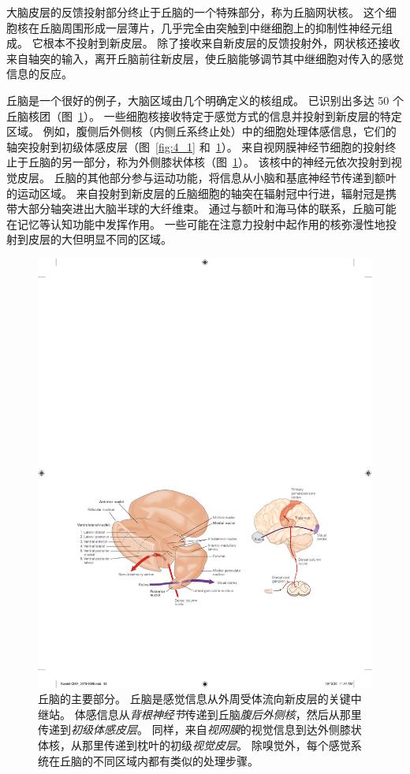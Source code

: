 大脑皮层的反馈投射部分终止于丘脑的一个特殊部分，称为丘脑网状核。 
这个细胞核在丘脑周围形成一层薄片，几乎完全由突触到中继细胞上的抑制性神经元组成。 
它根本不投射到新皮层。 
除了接收来自新皮层的反馈投射外，网状核还接收来自轴突的输入，离开丘脑前往新皮层，使丘脑能够调节其中继细胞对传入的感觉信息的反应。


丘脑是一个很好的例子，大脑区域由几个明确定义的核组成。
已识别出多达 50 个丘脑核团（图~\ref{fig:4_7}）。
一些细胞核接收特定于感觉方式的信息并投射到新皮层的特定区域。
例如，腹侧后外侧核（内侧丘系终止处）中的细胞处理体感信息，它们的轴突投射到初级体感皮层（图~\ref{fig:4_1} 和~\ref{fig:4_7}）。 
来自视网膜神经节细胞的投射终止于丘脑的另一部分，称为外侧膝状体核（图~\ref{fig:4_7}）。 
该核中的神经元依次投射到视觉皮层。 
丘脑的其他部分参与运动功能，将信息从小脑和基底神经节传递到额叶的运动区域。 
来自投射到新皮层的丘脑细胞的轴突在辐射冠中行进，辐射冠是携带大部分轴突进出大脑半球的大纤维束。 
通过与额叶和海马体的联系，丘脑可能在记忆等认知功能中发挥作用。 
一些可能在注意力投射中起作用的核弥漫性地投射到皮层的大但明显不同的区域。


\begin{figure}[htbp]
	\centering
	\includegraphics[width=1.0\linewidth]{chap04/fig_4_7}
	\caption{丘脑的主要部分。
		丘脑是感觉信息从外周受体流向新皮层的关键中继站。
		体感信息从\textit{背根神经节}传递到丘脑\textit{腹后外侧核}，然后从那里传递到\textit{初级体感皮层}。
		同样，来自\textit{视网膜}的视觉信息到达外侧膝状体核，从那里传递到枕叶的初级\textit{视觉皮层}。
		除嗅觉外，每个感觉系统在丘脑的不同区域内都有类似的处理步骤。}
	\label{fig:4_7}
\end{figure}


